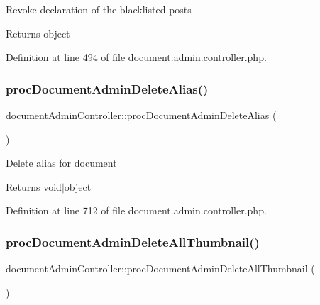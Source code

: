 Revoke declaration of the blacklisted posts \begin{DoxyReturn}{Returns}
object 
\end{DoxyReturn}


Definition at line 494 of file document.\+admin.\+controller.\+php.

\hypertarget{classdocumentAdminController_ab2f0c552145e0a56841e0aa7e8e03ae7}{}\label{classdocumentAdminController_ab2f0c552145e0a56841e0aa7e8e03ae7} 
\subsubsection{\texorpdfstring{proc\+Document\+Admin\+Delete\+Alias()}{procDocumentAdminDeleteAlias()}}
{\footnotesize\ttfamily document\+Admin\+Controller\+::proc\+Document\+Admin\+Delete\+Alias (\begin{DoxyParamCaption}{ }\end{DoxyParamCaption})}

Delete alias for document \begin{DoxyReturn}{Returns}
void$\vert$object 
\end{DoxyReturn}


Definition at line 712 of file document.\+admin.\+controller.\+php.

\hypertarget{classdocumentAdminController_a9ff3a9934c8bfa4d2ded4287920c0362}{}\label{classdocumentAdminController_a9ff3a9934c8bfa4d2ded4287920c0362} 
\subsubsection{\texorpdfstring{proc\+Document\+Admin\+Delete\+All\+Thumbnail()}{procDocumentAdminDeleteAllThumbnail()}}
{\footnotesize\ttfamily document\+Admin\+Controller\+::proc\+Document\+Admin\+Delete\+All\+Thumbnail (\begin{DoxyParamCaption}{ }\end{DoxyParamCaption})}

